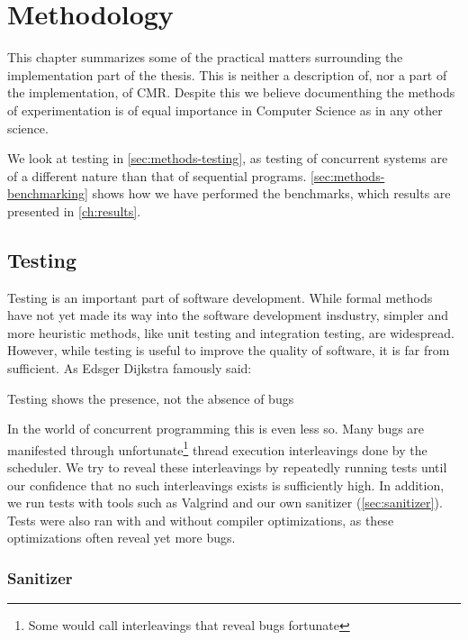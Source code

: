 \chapter{Methodology\label{ch:methodology}}

This chapter summarizes some of the practical matters surrounding the implementation part of the
thesis. This is neither a description of, nor a part of the implementation, of CMR\@. Despite this
we believe documenthing the methods of experimentation is of equal importance in Computer Science
as in any other science.

We look at testing in \cref{sec:methods-testing}, as testing of concurrent systems are of a
different nature than that of sequential programs.  \cref{sec:methods-benchmarking} shows how we
have performed the benchmarks, which results are presented in \cref{ch:results}.


\clearpage

\section{Testing\label{sec:methods-testing}}

Testing is an important part of software development. While formal methods have not yet made its
way into the software development insdustry, simpler and more heuristic methods, like unit testing
and integration testing, are widespread. However, while testing is useful to improve the quality of
software, it is far from sufficient. As Edsger Dijkstra famously said\cite{buxton1970software}:
\begin{displayquote}
Testing shows the presence, not the absence of bugs
\end{displayquote}

In the world of concurrent programming this is even less so. Many bugs are manifested through
unfortunate\footnote{Some would call interleavings that reveal bugs fortunate} thread execution
interleavings done by the scheduler. We try to reveal these interleavings by repeatedly running
tests until our confidence that no such interleavings exists is sufficiently high. In addition, we
run tests with tools such as Valgrind\cite{valgrind} and our own sanitizer (\cref{sec:sanitizer}).
Tests were also ran with and without compiler optimizations, as these optimizations often reveal
yet more bugs.


\subsection{Sanitizer\label{sec:sanitizer}}

